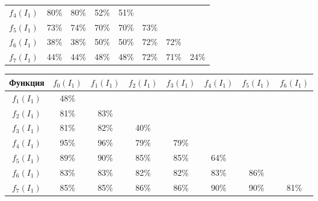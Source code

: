 \begin{multicols}{2}
\begin{table}[b]
\begin{center}
\begin{tabular}{|c|c|c|c|c|c|c|c|}
$f_4(I_1)$&80\%&80\%&52\%&51\%&&&\\

$f_5(I_1)$&73\%&74\%&70\%&70\%&73\%&&\\

$f_6(I_1)$&38\%&38\%&50\%&50\%&72\%&72\%&\\

$f_7(I_1)$&44\%&44\%&48\%&48\%&72\%&71\%&24\%\\

\hline

\end{tabular}

\end{center}

\end{table}



  \begin{table}\small %

  \begin{center}


  \vspace*{2ex}



  \begin{tabular}{|c|c|c|c|c|c|c|c|}

  \hline

\multicolumn{1}{|c|}{Функция}&$f_0(I_1)$&$f_1(I_1)$&$f_2(I_1)$&$f_3(I_1)$&$f_4(I_1)$&$f_5(I_1)$&$f_6(I_1)$\\

\hline

$f_1(I_1)$&48\%&&&&&&\\

$f_2(I_1)$&81\%&83\%&&&&&\\

$f_3(I_1)$&81\%&82\%&40\%&&&&\\

$f_4(I_1)$&95\%&96\%&79\%&79\%&&&\\

$f_5(I_1)$&89\%&90\%&85\%&85\%&64\%&&\\

$f_6(I_1)$&83\%&83\%&82\%&82\%&83\%&86\%&\\

$f_7(I_1)$&85\%&85\%&86\%&86\%&90\%&90\%&81\%\\

\hline

\end{tabular}

\end{center}

\end{table}



\end{multicols}



